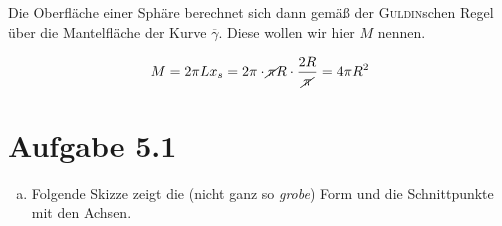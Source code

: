 \documentclass[a4paper,german,12pt,smallheadings]{scrartcl}
\begin{document}
Die Oberfläche einer Sphäre berechnet sich dann gemäß der \textsc{Guldin}schen
Regel über die Mantelfläche der Kurve $\overline{\gamma}$. Diese wollen wir
hier $M$ nennen.

\begin{equation*}
  M = 2 \pi L x_s = 2 \pi \cdot \cancel{\pi} R \cdot \frac{2R}{\cancel{\pi}} = 4 \pi R^2
\end{equation*}

\section*{Aufgabe 5.1}
\begin{enumerate}[a)]
  \item
    Folgende Skizze zeigt die (nicht ganz so \textit{grobe}) Form und die
    Schnittpunkte mit den Achsen.

    \begin{figure*}[h]
    \end{figure*}

\end{enumerate}
\end{document}
